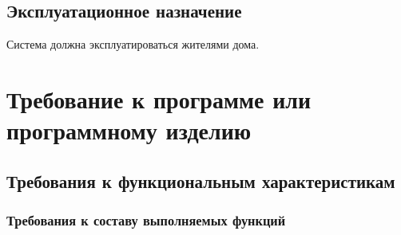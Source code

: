   \subsection{Эксплуатационное назначение}
  
    Система должна эксплуатироваться жителями дома.
\section{Требование к программе или программному изделию}
  \subsection{Требования к функциональным характеристикам}
    \subsubsection{Требования к составу выполняемых функций}
    
